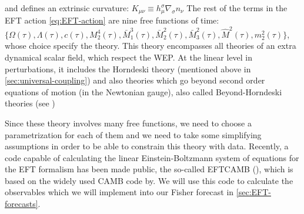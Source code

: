 and defines an extrinsic curvature:
\beeqp$
K_{\mu \nu} \equiv h^{\sigma}_{\mu} \nabla_{\sigma} n_\nu
$
The rest of the terms in the EFT action \cref{eq:EFT-action} are nine free functions of time:\\
$\{\Omega(\tau), \Lambda(\tau), c(\tau), M_{2}^4 (\tau), \bar{M}_{1}^3 (\tau), \bar{M}_2^2 (\tau), \bar{M}_3^2 (\tau),
 \hat{M}^2 (\tau), m^2_2(\tau)\}$, whose choice specify the theory.
This theory encompasses all theories of an extra dynamical scalar field, which respect the WEP.
At the linear level in perturbations, it includes the Horndeski theory (mentioned above in \cref{sec:universal-coupling}) 
and also theories which go beyond second order equations of motion (in the Newtonian gauge), also called
Beyond-Horndeski theories (see \cite{gleyzes2015exploring})

Since these theory involves many free functions, we need to choose a parametrization for each of them and 
we need to take some simplifying assumptions in order to be able to constrain this theory with data.
Recently, a code capable of calculating the linear Einstein-Boltzmann system of equations for the EFT formalism
has been made public, the so-called \textsc{EFTCAMB} (\cite{hu_effective_2014, hu_eftcamb/eftcosmomc:_2014-2}), which is based 
on the widely used \textsc{CAMB} code by\cite{lewis_efficient_2000}. 
We will use this code to calculate the observables which we will 
implement into our Fisher forecast in \cref{sec:EFT-forecasts}.

